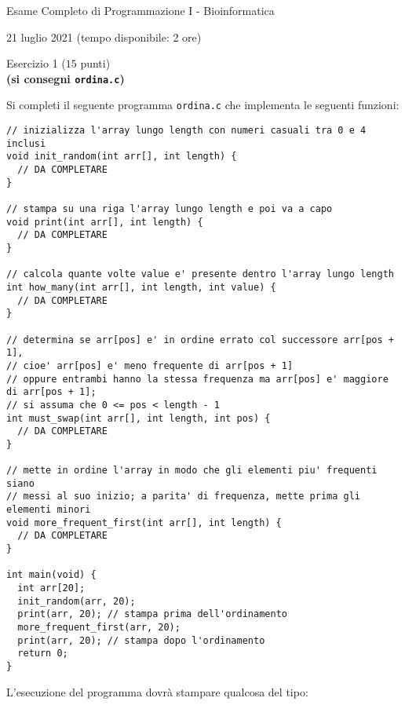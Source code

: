 \documentclass[12pt]{article}
\begin{document}
\begin{center}{\LARGE Esame Completo di Programmazione I - Bioinformatica}\\
\begin{center}
  \large 21 luglio 2021 (tempo disponibile: 2 ore)
\end{center}
\end{center}

\vspace*{1ex}
\begin{center}{\Large Esercizio 1} ($15$ punti)\\
  \textbf{(si consegni \texttt{ordina.c})}
\end{center}
Si completi il seguente programma \texttt{ordina.c} che implementa le seguenti funzioni:

\begin{center}
\begin{lstlisting}[language=myC]
// inizializza l'array lungo length con numeri casuali tra 0 e 4 inclusi
void init_random(int arr[], int length) {
  // DA COMPLETARE
}

// stampa su una riga l'array lungo length e poi va a capo
void print(int arr[], int length) {
  // DA COMPLETARE
}

// calcola quante volte value e' presente dentro l'array lungo length
int how_many(int arr[], int length, int value) {
  // DA COMPLETARE
}

// determina se arr[pos] e' in ordine errato col successore arr[pos + 1],
// cioe' arr[pos] e' meno frequente di arr[pos + 1]
// oppure entrambi hanno la stessa frequenza ma arr[pos] e' maggiore di arr[pos + 1];
// si assuma che 0 <= pos < length - 1
int must_swap(int arr[], int length, int pos) {
  // DA COMPLETARE
}

// mette in ordine l'array in modo che gli elementi piu' frequenti siano
// messi al suo inizio; a parita' di frequenza, mette prima gli elementi minori
void more_frequent_first(int arr[], int length) {
  // DA COMPLETARE
}

int main(void) {
  int arr[20];
  init_random(arr, 20);
  print(arr, 20); // stampa prima dell'ordinamento
  more_frequent_first(arr, 20);
  print(arr, 20); // stampa dopo l'ordinamento
  return 0;
}
\end{lstlisting}
\end{center}

\noindent
L'esecuzione del programma dovr\`a stampare qualcosa del tipo:
\end{document}
